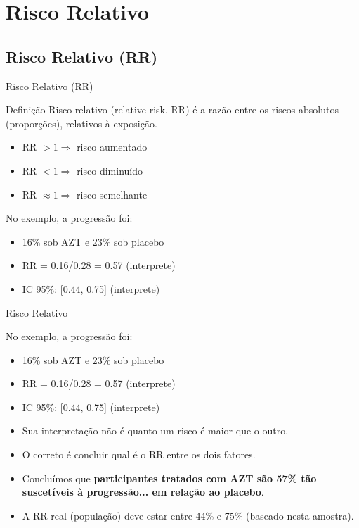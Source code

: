 \documentclass{beamer}
\begin{document}
\section{Risco Relativo}

\subsection{Risco Relativo (RR)}

\begin{frame}{Risco Relativo (RR)}
  \begin{block}{Definição}
    Risco relativo (relative risk, RR) é a razão entre os riscos absolutos (proporções), relativos à exposição.
  \end{block}
  \begin{itemize}
  \item RR $> 1 \Rightarrow$ risco aumentado
  \item RR $< 1 \Rightarrow$ risco diminuído
  \item RR $\approx 1 \Rightarrow$ risco semelhante
  \end{itemize}
  \begin{exampleblock}{No exemplo, a progressão foi:}
    \begin{itemize}
    \item 16\% sob AZT e 23\% sob placebo
    \item RR = 0.16/0.28 = 0.57 (interprete)
    \item<2-> IC 95\%: [0.44, 0.75] (interprete)
    \end{itemize}
  \end{exampleblock}
\end{frame}

\begin{frame}{Risco Relativo}
  \begin{exampleblock}{No exemplo, a progressão foi:}
    \begin{itemize}
    \item 16\% sob AZT e 23\% sob placebo
    \item RR = 0.16/0.28 = 0.57 (interprete)
    \item IC 95\%: [0.44, 0.75] (interprete)
    \end{itemize}
  \end{exampleblock}
  \begin{itemize}
  \item Sua interpretação \alert{não é} quanto um risco é maior que o outro.
  \item O correto é concluir qual é o RR \alert{entre} os dois fatores.
  \item Concluímos que {\bf participantes tratados com AZT são 57\% tão suscetíveis à progressão... em relação ao placebo}.
  \item A RR real (população) deve estar entre 44\% e 75\% (baseado nesta amostra).
  \end{itemize}
\end{frame}
\end{document}
